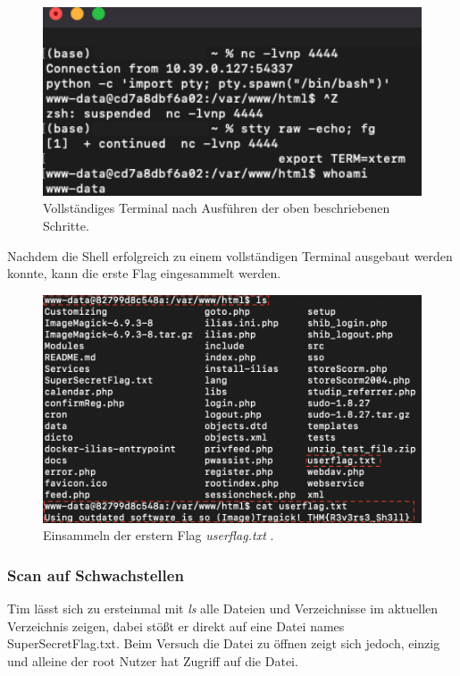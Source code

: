 \documentclass[10pt, a4paper,onecolumn ,titlepage]{article}
\begin{document}
    \begin{figure}[H]
        \centering
        \includegraphics[width=1\textwidth]{storyline_bilder_vm2/shellStabilisierenGanz}
        \caption{Vollständiges Terminal nach Ausführen der oben beschriebenen Schritte.}
        \label{fig:shellStabilisiert}
    \end{figure}
    \noindent
    Nachdem die Shell erfolgreich zu einem vollständigen Terminal ausgebaut werden konnte, kann die erste Flag eingesammelt werden.

    \begin{figure}[H]
        \centering
        \includegraphics[width=1\textwidth]{storyline_bilder_vm2/userflag}
        \caption{Einsammeln der erstern Flag \textit{userflag.txt} .}
        \label{fig:userflag}
    \end{figure}
    \noindent




    \subsubsection{Scan auf Schwachstellen}
    \label{subsubsec:scanSchwachstellen}
    Tim lässt sich zu ersteinmal mit \textit{ls} alle Dateien und Verzeichnisse im aktuellen Verzeichnis zeigen, dabei stößt er direkt auf eine Datei names SuperSecretFlag.txt.
    Beim Versuch die Datei zu öffnen zeigt sich jedoch, einzig und alleine der root Nutzer hat Zugriff auf die Datei.
\end{document}
